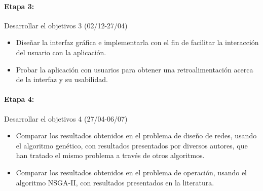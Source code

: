 \documentclass[11pt,letterpaper]{article}
\begin{document}
\paragraph{Etapa 3:} Desarrollar el objetivos 3 (02/12-27/04)
\begin{itemize}
	\item Diseñar la interfaz gráfica e implementarla con el fin de facilitar la interacción del usuario con la aplicación.
	\item Probar la aplicación con usuarios para obtener una retroalimentación acerca de la interfaz y su usabilidad.
\end{itemize}

\paragraph{Etapa 4:} Desarrollar el objetivos 4 (27/04-06/07)
\begin{itemize}
	\item Comparar los resultados obtenidos en el problema de diseño de redes, usando el algoritmo genético, con resultados presentados por diversos autores, que han tratado el mismo problema a través de otros algoritmos.
	\item Comparar los resultados obtenidos en el problema de operación, usando el algoritmo NSGA-II, con resultados presentados en la literatura.
\end{itemize}





\end{document}
